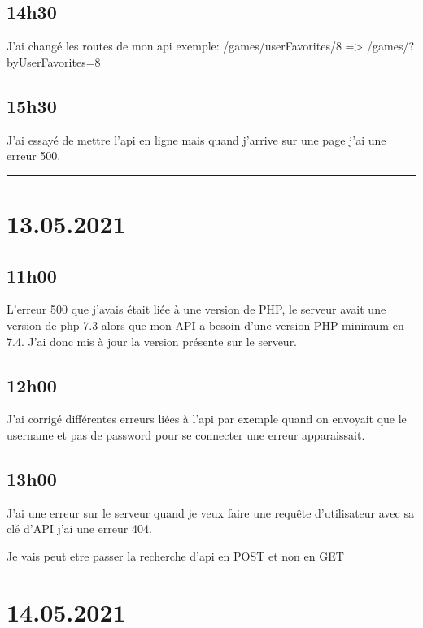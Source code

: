 \documentclass[a4paper,12pt,french]{sphinxmanual}
\begin{document}
\subsection{14h30}
\label{\detokenize{logbook:id107}}
\sphinxAtStartPar
J’ai changé les routes de mon api
exemple:
/games/userFavorites/8  => /games/?byUserFavorites=8


\subsection{15h30}
\label{\detokenize{logbook:id108}}
\sphinxAtStartPar
J’ai essayé de mettre l’api en ligne mais quand j’arrive sur une page j’ai une erreur 500.


\bigskip\hrule\bigskip



\section{13.05.2021}
\label{\detokenize{logbook:id109}}

\subsection{11h00}
\label{\detokenize{logbook:id110}}
\sphinxAtStartPar
L’erreur 500 que j’avais était liée à une version de PHP, le serveur avait une version de php 7.3 alors que mon API a besoin d’une version PHP minimum en 7.4.
J’ai donc mis à jour la version présente sur le serveur.


\subsection{12h00}
\label{\detokenize{logbook:id111}}
\sphinxAtStartPar
J’ai corrigé différentes erreurs liées à l’api par exemple quand on envoyait que le username et pas de password pour se connecter une erreur apparaissait.


\subsection{13h00}
\label{\detokenize{logbook:id112}}
\sphinxAtStartPar
J’ai une erreur sur le serveur quand je veux faire une requête d’utilisateur avec sa clé d’API j’ai une erreur 404.

\sphinxAtStartPar
Je vais peut etre passer la recherche d’api en POST et non en GET


\section{14.05.2021}
\label{\detokenize{logbook:id113}}
\end{document}
